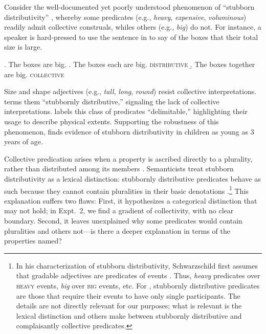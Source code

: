 \documentclass[linguex]{sp}
\begin{document}
Consider the well-documented yet poorly understood phenomenon of ``stubborn distributivity'' \citep{quine1960,schwarzschild2011,vazquezrojas2012,zhang2013,syrett2015}, whereby some predicates (e.g., \emph{heavy}, \emph{expensive}, \emph{voluminous}) readily admit collective construals, whiles others (e.g., \emph{big}) do not. 
For instance, a speaker is hard-pressed to use the sentence in \Next to say of the boxes that their total size is large.

\ex. The boxes are big.
\a. The boxes each are big. \hfill \textsc{distributive}
\b. The boxes together are big. \hfill {}\textsc{collective}

Size and shape adjectives (e.g., \emph{tall}, \emph{long}, \emph{round}) resist collective interpretations. \cite{schwarzschild2011} terms them ``stubbornly distributive,'' signaling the lack of collective interpretations. \citet{zhang2013} labels this class of predicates ``delimitable,'' highlighting their usage to describe physical extents. Supporting the robustness of this phenomenon, \cite{syrett2015} finds evidence of stubborn distributivity in children as young as 3 years of age.

Collective predication arises when a property is ascribed directly to a plurality, rather than distributed among its members \citep{link1983}. Semanticists treat stubborn distributivity as a lexical distinction: stubbornly distributive predicates behave as such because they cannot contain pluralities in their basic denotations \citep{schwarzschild2011,vazquezrojas2012,zhang2013}.\footnote{In his characterization of stubborn distributivity, Schwarzschild first assumes that gradable adjectives are predicates of events \citep[e.g.,][]{higginbothamschein1989}. Thus, \emph{heavy} predicates over \textsc{heavy} events, \emph{big} over \textsc{big} events, etc. For \citeauthor{schwarzschild2011}, stubbornly distributive predicates are those that require their events to have only single participants. The details are not directly relevant for our purposes; what is relevant is the lexical distinction \citeauthor{schwarzschild2011} and others make between stubbornly distributive and complaisantly collective predicates.}
This explanation suffers two flaws:
First, it hypothesizes a categorical distinction that may not hold; in Expt.~2, we find a gradient of collectivity, with no clear boundary.
Second, it leaves unexplained why some predicates would contain pluralities and others not---is there a deeper explanation in terms of the properties named?
\end{document}
